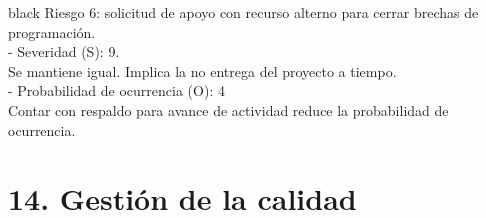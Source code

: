 \documentclass[
11pt, %
codirector, %
]{charter}
\begin{document}
\begin{consigna}{black}
Riesgo 6: solicitud de apoyo con recurso alterno para cerrar brechas de programación. \\ 
  - Severidad (S): 9. \\
	Se mantiene igual. Implica la no entrega del proyecto a tiempo. \\
  - Probabilidad de ocurrencia (O): 4 \\
	Contar con respaldo para avance de actividad reduce la probabilidad de ocurrencia. \\

\end{consigna}


\section{14. Gestión de la calidad}
\label{sec:calidad}
\end{document}
